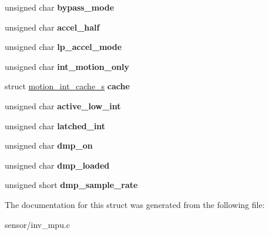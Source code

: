\begin{DoxyCompactItemize}
\item 
unsigned char {\bfseries bypass\+\_\+mode}\hypertarget{structchip__cfg__s_a2dd3f2719bc8ed1946811203ec330905}{}\label{structchip__cfg__s_a2dd3f2719bc8ed1946811203ec330905}

\item 
unsigned char {\bfseries accel\+\_\+half}\hypertarget{structchip__cfg__s_af73df77287fdeba8d408c18f3905650f}{}\label{structchip__cfg__s_af73df77287fdeba8d408c18f3905650f}

\item 
unsigned char {\bfseries lp\+\_\+accel\+\_\+mode}\hypertarget{structchip__cfg__s_aeb8fb45fc306b199be68b3f61940fbb0}{}\label{structchip__cfg__s_aeb8fb45fc306b199be68b3f61940fbb0}

\item 
unsigned char {\bfseries int\+\_\+motion\+\_\+only}\hypertarget{structchip__cfg__s_a28c5c373e0d7189a11c4ae5ca351ca30}{}\label{structchip__cfg__s_a28c5c373e0d7189a11c4ae5ca351ca30}

\item 
struct \hyperlink{structmotion__int__cache__s}{motion\+\_\+int\+\_\+cache\+\_\+s} {\bfseries cache}\hypertarget{structchip__cfg__s_aab21a113d97da9c015f6f1928662927b}{}\label{structchip__cfg__s_aab21a113d97da9c015f6f1928662927b}

\item 
unsigned char {\bfseries active\+\_\+low\+\_\+int}\hypertarget{structchip__cfg__s_ac576d810c0c8bcd73af5908c10a83c3a}{}\label{structchip__cfg__s_ac576d810c0c8bcd73af5908c10a83c3a}

\item 
unsigned char {\bfseries latched\+\_\+int}\hypertarget{structchip__cfg__s_a6c37b8cd7cf4fd08a3200129cd23255c}{}\label{structchip__cfg__s_a6c37b8cd7cf4fd08a3200129cd23255c}

\item 
unsigned char {\bfseries dmp\+\_\+on}\hypertarget{structchip__cfg__s_a49fb51079238683b21264827348b5968}{}\label{structchip__cfg__s_a49fb51079238683b21264827348b5968}

\item 
unsigned char {\bfseries dmp\+\_\+loaded}\hypertarget{structchip__cfg__s_afc32c3e58317c589014257dc9b1ee04b}{}\label{structchip__cfg__s_afc32c3e58317c589014257dc9b1ee04b}

\item 
unsigned short {\bfseries dmp\+\_\+sample\+\_\+rate}\hypertarget{structchip__cfg__s_a5d17c6049cc8cb74faf5cdb942988294}{}\label{structchip__cfg__s_a5d17c6049cc8cb74faf5cdb942988294}

\end{DoxyCompactItemize}


The documentation for this struct was generated from the following file\+:\begin{DoxyCompactItemize}
\item 
sensor/inv\+\_\+mpu.\+c\end{DoxyCompactItemize}

